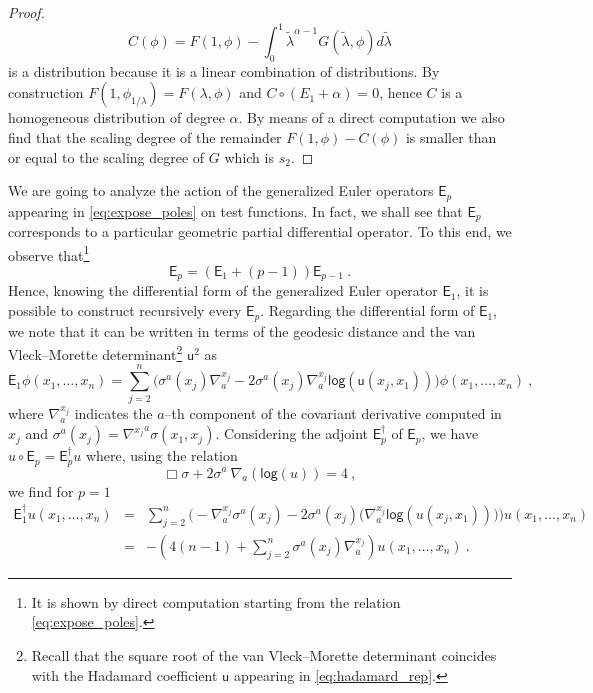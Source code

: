 \documentclass[11pt]{book}
\renewcommand{\log}{\mathsf{log}}
\newcommand{\Esf}{\mathsf{E}}
\newcommand{\usf}{\mathsf{u}}
\theoremstyle{break}
\begin{document}
\begin{proof}
%
\begin{equation*}
C(\phi) = F(1,\phi) - \int_0^1  \tilde{\lambda}^{\alpha-1} G(\tilde{\lambda},\phi) d\tilde{\lambda} 
\end{equation*}
%
is a distribution because it is a linear combination of distributions. By construction $F(1,\phi_{1/\lambda})=F(\lambda,\phi)$ and $C\circ (E_1+\alpha) =0$, hence $C$ is a homogeneous distribution of degree $\alpha$. By means of a direct computation we also find that the scaling degree of the remainder $F(1,\phi)-C(\phi)$ is smaller than or equal to the scaling degree of $G$ which is $s_2$.
\end{proof}



We are going to analyze the action of the generalized Euler operators $\Esf_p$ appearing in \eqref{eq:expose_poles} on test functions. In fact, we shall see that $\Esf_p$ corresponds to a particular geometric partial differential operator. To this end, we observe that\footnote{It is shown by direct computation starting from the relation \eqref{eq:expose_poles}.}
%
\begin{equation*}
\Esf_p = (\Esf_1 + (p-1)) \Esf_{p-1} \ . 
\end{equation*}
%
Hence, knowing the differential form of the generalized Euler operator $\Esf_1$, it is possible to construct recursively every $\Esf_p$. Regarding the differential form of $\Esf_1$, we note that it can be written in terms of the geodesic distance and the van Vleck--Morette determinant\footnote{Recall that the square root of the van Vleck--Morette determinant coincides with the Hadamard coefficient $\usf$ appearing in \eqref{eq:hadamard_rep}.} $\usf^2$  as
%
\begin{equation*}
\Esf_1 \phi(x_1 , \dots , x_n) = \sum_{j=2}^n \bigg( \sigma^a(x_j) \nabla^{x_j}_a  - 2  \sigma^a(x_j) \nabla^{x_j}_a  \log\left(\usf(x_j,x_1)\right) \bigg) \phi(x_1 , \dots , x_n) \ , 
\end{equation*}
%
where $\nabla^{x_j}_a$ indicates the $a$--th component of the covariant derivative computed in $x_j$ and $\sigma^a(x_j) = {\nabla^{x_j}}^a \sigma(x_1,x_j)$. Considering the adjoint $\Esf^\dagger_p$ of $\Esf_p$, we have $u \circ \Esf_p = \Esf^\dagger_p u$ where, using the relation
\begin{equation*}
\Box \sigma + 2 \sigma^a \ \nabla_a\left( \log (u) \right) = 4 \ , 
\end{equation*}
%
we find for $p=1$
%
\begin{eqnarray}
\Esf_1^\dagger  u(x_1,\dots,x_n) &=& \sum_{j=2}^n \Bigg( - \nabla^{x_j}_a \sigma^a(x_j) - 2 \sigma^a(x_j) \bigg( \nabla^{x_j}_a \log\left(u(x_j,x_1)\right) \bigg) \Bigg) u(x_1,\dots,x_n) \nonumber \\
&=& -\left( 4(n-1) + \sum_{j=2}^n \sigma^a(x_j) \nabla^{x_j}_a \right) u(x_1,\dots,x_n) \ .
\label{eq:euler_operator}
\end{eqnarray}
\end{document}

